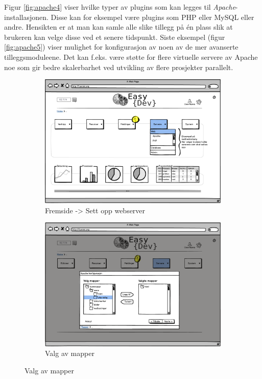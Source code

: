 Figur \ref{fig:apache4} viser hvilke typer av plugins som kan legges til \textit{Apache}-installasjonen. Disse kan for eksempel være plugins som PHP eller MySQL eller andre. Hensikten er at man kan samle alle slike tillegg på én plass slik at brukeren kan velge disse ved et senere tidspunkt.
Siste eksempel (figur \ref{fig:apache5}) viser mulighet for konfigurasjon av noen av de mer avanserte tilleggsmoduleene. Det kan f.eks. være støtte for flere virtuelle servere av Apache noe som gir bedre skalerbarhet ved utvikling av flere prosjekter parallelt. 
\begin{figure}[p]
        \centering
        \begin{subfigure}[b]{0.48\textwidth}
                \includegraphics[width=\textwidth]
                {./img/prosessdokumentasjon/lowfi/apache1.png}
                \caption{Fremside -> Sett opp webserver}
                \label{fig:apache1}
        \end{subfigure}
        \begin{subfigure}[b]{0.48\textwidth}
                \includegraphics[width=\textwidth]
                {./img/prosessdokumentasjon/lowfi/apache2.png}
                \caption{Valg av mapper}
                \label{fig:apache2}
        \end{subfigure}
       

\end{figure}
